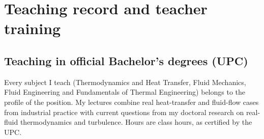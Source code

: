 \documentclass[11pt]{article}
\begin{document}
\section{Teaching record and teacher training}\label{sec:teaching}

\subsection{Teaching in official Bachelor's degrees (UPC)}
Every subject I teach (Thermodynamics and Heat Transfer, Fluid Mechanics, Fluid Engineering
and Fundamentals of Thermal Engineering) belongs to the profile of the position. My lectures
combine real heat-transfer and fluid-flow cases from industrial practice with current
questions from my doctoral research on real-fluid thermodynamics and turbulence. Hours are
class hours, as certified by the UPC.
\end{document}
